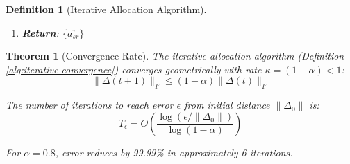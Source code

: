 \documentclass[11pt]{article}
\newtheorem{definition}{Definition}
\newtheorem{theorem}{Theorem}
\begin{document}
\begin{definition}[Iterative Allocation Algorithm]
\begin{enumerate}
\begin{enumerate}
  \item \textbf{Compute distances} for each recipient $r$:
  \begin{align*}
  A_r^\tau &\leftarrow \sum_{s \in S} a_{sr}^\tau \\
  \Delta_r^\tau &\leftarrow |q_r| - A_r^\tau
  \end{align*}
  
  \item \textbf{Adjust allocations} for each provider $s$ and recipient $r$:
  \begin{align*}
  d_{sr} &\leftarrow a_{sr}^\tau - t_{sr}^\tau \\
  a_{sr}^\tau &\leftarrow \begin{cases}
  a_{sr}^\tau - \alpha |d_{sr}| & \text{if } \Delta_r^\tau < 0 \text{ (retract from overshoot)} \\
  a_{sr}^\tau + \alpha |d_{sr}| & \text{if } \Delta_r^\tau > 0 \text{ (expand toward undershoot)} \\
  a_{sr}^\tau - \alpha \cdot d_{sr} & \text{if } \Delta_r^\tau = 0 \text{ (rebalance for alignment)}
  \end{cases}
  \end{align*}
  
  \item \textbf{Check convergence}:
  \[
  \text{if } \max_{r \in R, \tau} |\Delta_r^\tau| < \epsilon \text{ then break}
  \]
  \end{enumerate}

\item \textbf{Return}: $\{a_{sr}^\tau\}$
\end{enumerate}
\end{definition}

\begin{theorem}[Convergence Rate]
\label{thm:convergence-rate}
The iterative allocation algorithm (Definition \ref{alg:iterative-convergence}) converges geometrically with rate $\kappa = (1-\alpha) < 1$:
\[
\|\Delta(t+1)\|_F \leq (1-\alpha) \|\Delta(t)\|_F
\]

The number of iterations to reach error $\epsilon$ from initial distance $\|\Delta_0\|$ is:
\[
T_\epsilon = O\left(\frac{\log(\epsilon / \|\Delta_0\|)}{\log(1-\alpha)}\right)
\]

For $\alpha = 0.8$, error reduces by 99.99\% in approximately 6 iterations.
\end{theorem}
\end{document}
